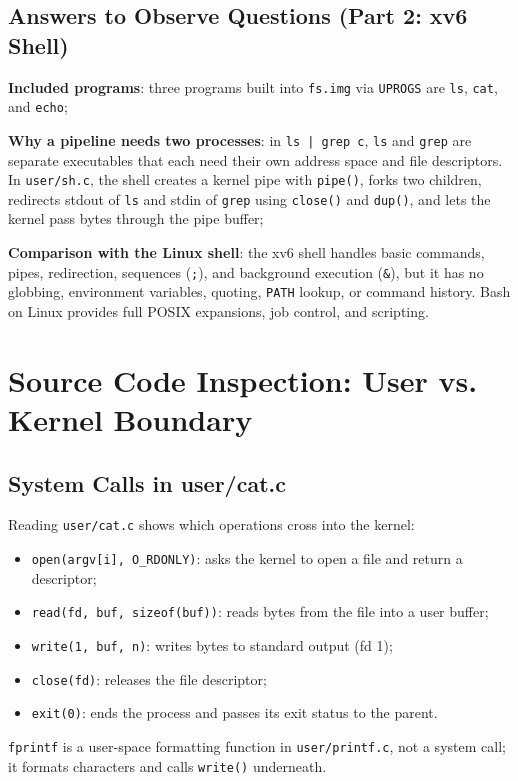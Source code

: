 \documentclass{assets/utmreport}
\begin{document}
\section{Answers to Observe Questions (Part 2: xv6 Shell)}
\begin{utmenumerate}
\item \textbf{Included programs}: three programs built into \texttt{fs.img} via \texttt{UPROGS} are \texttt{ls}, \texttt{cat}, and \texttt{echo};
\item \textbf{Why a pipeline needs two processes}: in \texttt{ls | grep c}, \texttt{ls} and \texttt{grep} are separate executables that each need their own address space and file descriptors. In \texttt{user/sh.c}, the shell creates a kernel pipe with \texttt{pipe()}, forks two children, redirects stdout of \texttt{ls} and stdin of \texttt{grep} using \texttt{close()} and \texttt{dup()}, and lets the kernel pass bytes through the pipe buffer;
\item \textbf{Comparison with the Linux shell}: the xv6 shell handles basic commands, pipes, redirection, sequences (\texttt{;}), and background execution (\texttt{\&}), but it has no globbing, environment variables, quoting, \texttt{PATH} lookup, or command history. Bash on Linux provides full POSIX expansions, job control, and scripting.
\end{utmenumerate}

\chapter{Source Code Inspection: User vs. Kernel Boundary}

\section{System Calls in user/cat.c}
Reading \texttt{user/cat.c} shows which operations cross into the kernel:
\begin{itemize}
\item \texttt{open(argv[i], O\_RDONLY)}: asks the kernel to open a file and return a descriptor;
\item \texttt{read(fd, buf, sizeof(buf))}: reads bytes from the file into a user buffer;
\item \texttt{write(1, buf, n)}: writes bytes to standard output (fd 1);
\item \texttt{close(fd)}: releases the file descriptor;
\item \texttt{exit(0)}: ends the process and passes its exit status to the parent.
\end{itemize}
\texttt{fprintf} is a user-space formatting function in \texttt{user/printf.c}, not a system call; it formats characters and calls \texttt{write()} underneath.
\end{document}
